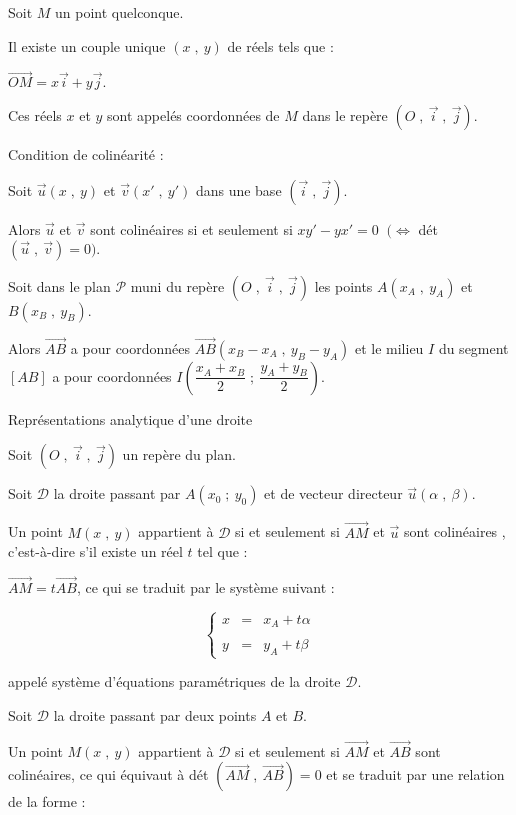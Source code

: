 \documentclass{article}
\begin{document}
		Soit $M$ un point quelconque.
		
		Il existe un couple unique $(x\;,\ y)$ de réels tels que :
		
		$\overrightarrow{OM}=x\vec{i}+y\vec{j}.$
		
		Ces réels $x$ et $y$ sont appelés coordonnées de $M$ dans le repère $(O\;,\ \vec{i}\;,\ \vec{j}).$
		
		
		Condition de colinéarité :
		
		Soit $\vec{u}(x\;,\ y)$ et $\vec{v}(x'\;,\ y')$ dans une base $(\vec{i}\;,\ \vec{j}).$
		
		Alors $\vec{u}$ et $\vec{v}$ sont colinéaires si et seulement si $xy'-yx'=0$ $\ (\Leftrightarrow$ dét$(\vec{u}\;,\ \vec{v})=0).$
		
		Soit dans le plan $\mathcal{P}$ muni du repère $(O\;,\ \vec{i}\;,\ \vec{j})$ les points $A\left(x_{A}\;,\ y_{A}\right)$ et $B\left(x_{B}\;,\ y_{B}\right).$
		
		Alors $\overrightarrow{AB}$ a pour coordonnées $\overrightarrow{AB}\left(x_{B}-x_{A}\;,\ y_{B}-y_{A}\right)$ et le milieu $I$ du segment $[AB]$ a pour coordonnées $I\left(\dfrac{x_{A}+x_{B}}{2}\;;\ \dfrac{y_{A}+y_{B}}{2}\right).$
		
		Représentations analytique d'une droite
		
		Soit $(O\;,\ \vec{i}\;,\ \vec{j})$ un repère du plan.
		
		Soit $\mathcal{D}$ la droite passant par $A(x_{0}\;;\ y_{0})$ et de vecteur directeur $\overrightarrow{u}(\alpha\;,\ \beta).$
		
		Un point $M(x\;,\ y)$ appartient à $\mathcal{D}$ si et seulement si $\overrightarrow{AM}$ et $\overrightarrow{u}$ sont colinéaires , c'est-à-dire s'il existe un réel $t$ tel que : 
		
		$\overrightarrow{AM}=t\overrightarrow{AB}$, ce qui se traduit par le système suivant :
		
		$$\left\lbrace\begin{array}{lcl} x& =& x_{A}+t\alpha\\ \\ y& =& y_{A}+t\beta \end{array}\right.$$
		
		appelé système d'équations paramétriques de la droite $\mathcal{D}.$
		
		Soit $\mathcal{D}$ la droite passant par deux points $A$ et $B.$ 
		
		Un point $M(x\;,\ y)$ appartient à $\mathcal{D}$ si et seulement si $\overrightarrow{AM}$ et $\overrightarrow{AB}$ sont colinéaires, ce qui équivaut à dét $ \left(\overrightarrow{AM}\;,\ \overrightarrow{AB}\right)=0$ et se traduit par une relation de la forme : 
		
\end{document}
